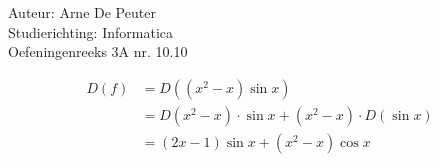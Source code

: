 \documentclass[a4paper]{article}
\begin{document}
\noindent \large Auteur: Arne De Peuter\\
\noindent \large Studierichting: Informatica\\
\noindent \large Oefeningenreeks 3A nr. 10.10\\

\medskip

\normalsize

\[
\begin{aligned}
D(f) &= D((x^2 - x) \sin x) \\
     &= D(x^2 - x) \cdot \sin x + (x^2 - x) \cdot D(\sin x) \\
     &= (2x - 1) \sin x + (x^2 - x) \cos x
\end{aligned}
\]


\end{document}
